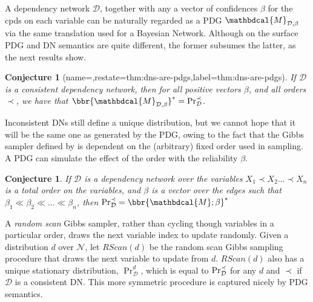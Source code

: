 \documentclass[letterpaper]{article} %
\theoremstyle{plain}
\newtheorem{lemma}[theorem]{Lemma}
\newtheorem{conj}[theorem]{Conjecture}
\theoremstyle{definition}
\theoremstyle{remark}
\newcommand{\begthm}[3][]{\begin{#2}[{name=#1},restate=#3,label=#3]}
\newcommand{\valpha}[1]{#1}
\newcommand\mat[1]{\mathbf{#1}}
\newcommand{\V}{\mathcal V}
\newcommand{\N}{\mathcal N}
\newcommand{\Ed}{\mathcal E}
\newcommand{\dg}[1]{\mathbdcal{#1}}
\newcommand{\IDef}[1]{\mathit{IDef}_{\!#1}}
\newcommand{\PDGof}[1]{{\dg M}_{#1}}
\begin{document}
{A dependency network $\mathcal D$, together with any a vector of confidences $\beta$ for the cpds on each variable
can be naturally regarded as a PDG $\PDGof{\mathcal D, \beta}$ 
via the same translation used for a Bayesian Network.
Although on the surface PDG and DN semantics are quite
different,
the former subsumes the latter, as the next results show.




\begthm{conj}{thm:dns-are-pdgs}
If $\mathcal D$ is a consistent dependency network,
then for all positive vectors $\beta$, and all orders $\prec$, we have that
$\bbr{\PDGof{\mathcal D, \beta}}^* =  \Pr_{\cal D}^\prec$.
\end{conj}

Inconsistent DNs still define a unique distribution, but we cannot hope that it 
will be the same one as generated by the PDG, owing to the fact that
the Gibbs sampler defined by \citeauthor{heckerman2000dependency} is dependent
on the (arbitrary) fixed order used in sampling.
A PDG can simulate the effect of the order with the reliability $\beta$.

\begin{conj}
If $\mathcal D$ is a dependency network over the variables
$X_1 \prec X_2  \ldots  \prec X_n$ is a total order on the variables, and $\beta$ is a vector over the edges
such that  $\beta_1 \ll\beta_2 \ll \ldots \ll \beta_n$, 
then $\Pr_{\cal D}^{\prec} = \bbr{\dg M; \beta}^*$
\end{conj}

A \emph{random scan} Gibbs sampler, rather than cycling though variables in a 
particular order, draws the next variable index to update randomly.
Given a distribution $d$ over $\N$,
let $\mathit{RScan}(d)$ be the random scan Gibbs sampling procedure that draws
the next variable to update from $d$. $\mathit{RScan}(d)$ also has a unique stationary distribution, $\Pr_{\mathcal D}^d$, which is equal to $\Pr_{\cal D}^{\prec}$ for any $d$ and $\prec$ if $\mathcal D$ is a consistent DN. This more symmetric procedure is captured nicely by PDG semantics.

}
\end{document}
